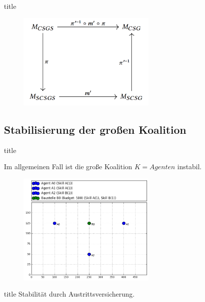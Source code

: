 \documentclass[c]{beamer}
\theoremstyle{break}
\begin{document}
  \begin{frame}{title}
    \begin{figure}
      \centering
      \includegraphics[width=0.6\textwidth]{bez.png}
    \end{figure}
  \end{frame}



  \subsection*{Stabilisierung der großen Koalition}
  \begin{frame}{title} %
    \begin{lemma}[Instabilität]
      Im allgemeinen Fall ist die große Koalition $K=Agenten$ instabil.
    \end{lemma}

      \begin{figure}
        \centering
        \includegraphics[width=0.6\textwidth]{example-exchangeable-agents.png}
        \label{szenario1}
      \end{figure}

  \end{frame}
  \begin{frame}{title} %
    Stabilität durch Austrittsversicherung.
  \end{frame}
\end{document}
